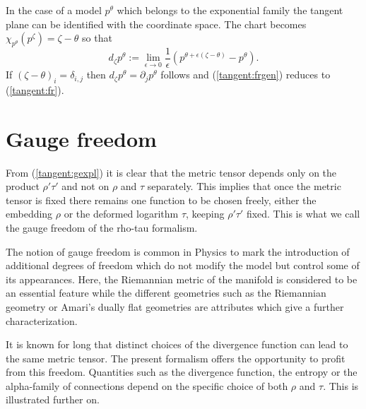 \documentclass[graybox]{svmult}
\newcommand{\add}[1]{{\color{blue}#1}}
\begin{document}
\add{
In the case of a model $p^\theta$
which belongs to the exponential family the tangent plane can be identified with
the coordinate space. The chart becomes $\chi_{p^\theta}(p^\zeta)=\zeta-\theta$ 
so that
$$d_\zeta p^\theta := \lim_{\epsilon \rightarrow 0}\frac 1\epsilon
\left(p^{\theta+\epsilon(\zeta-\theta)}-p^\theta\right).$$
If $(\zeta-\theta)_i=\delta_{i,j}$ then $d_\zeta p^\theta=\partial_jp^\theta$ follows and 
(\ref {tangent:frgen}) reduces to (\ref {tangent:fr}).
}


\section{Gauge freedom}
\label{sect:gauge}


From (\ref {tangent:gexpl}) it is clear that the metric tensor depends only
on the product $\rho'\tau'$ and not on $\rho$ and $\tau$ separately.
This  implies that once the metric tensor is fixed there remains one 
function to be chosen freely, either the embedding $\rho$ or the 
deformed logarithm $\tau$, keeping $\rho'\tau'$ fixed.
This is what we call the gauge freedom of the rho-tau formalism.

\add{
The notion of gauge freedom is common in Physics to mark the
introduction of additional degrees of freedom which do not modify the model
but control some of its appearances. Here, the Riemannian metric of the
manifold is considered to be an essential feature while the different geometries
such as the Riemannian geometry or Amari's dually flat geometries are attributes
which give a further characterization.
}

It is known for long that distinct choices of the divergence function
can lead to the same metric tensor. The present formalism offers
the opportunity to profit from this freedom. Quantities such as
the divergence function, the entropy or the alpha-family
of connections depend on the specific choice of both $\rho$ and $\tau$.
This is illustrated further on.
\end{document}
